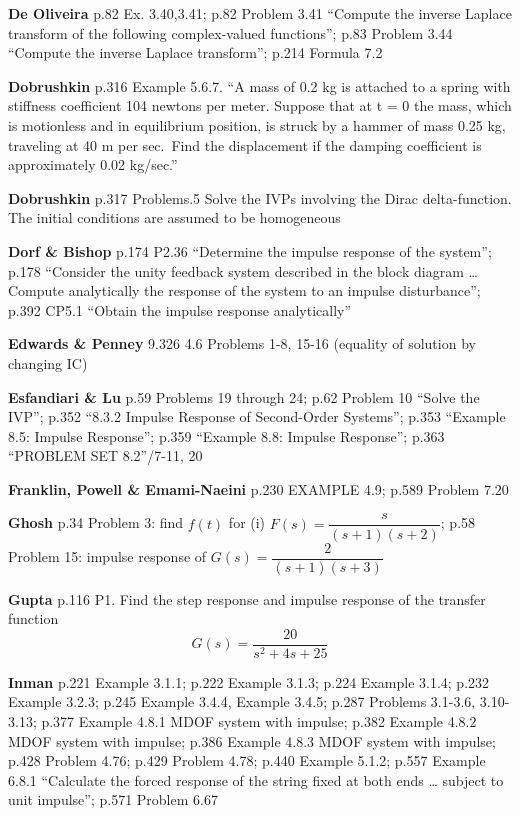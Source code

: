 \documentclass[
  11pt,
]{article}
\begin{document}
\textbf{De Oliveira} p.82 Ex. 3.40,3.41; p.82 Problem 3.41 ``Compute the
inverse Laplace transform of the following complex-valued functions'';
p.83 Problem 3.44 ``Compute the inverse Laplace transform''; p.214
Formula 7.2

\textbf{Dobrushkin} p.316 Example 5.6.7. ``A mass of 0.2 kg is attached
to a spring with stiffness coefficient 104 newtons per meter. Suppose
that at t = 0 the mass, which is motionless and in equilibrium position,
is struck by a hammer of mass 0.25 kg, traveling at 40 m per sec.~Find
the displacement if the damping coefficient is approximately 0.02
kg/sec.''

\textbf{Dobrushkin} p.317 Problems.5 Solve the IVPs involving the Dirac
delta-function. The initial conditions are assumed to be homogeneous

\textbf{Dorf \& Bishop} p.174 P2.36 ``Determine the impulse response of
the system''; p.178 ``Consider the unity feedback system described in
the block diagram \ldots{} Compute analytically the response of the
system to an impulse disturbance''; p.392 CP5.1 ``Obtain the impulse
response analytically''

\textbf{Edwards \& Penney} 9.326 4.6 Problems 1-8, 15-16 (equality of
solution by changing IC)

\textbf{Esfandiari \& Lu} p.59 Problems 19 through 24; p.62 Problem 10
``Solve the IVP''; p.352 ``8.3.2 Impulse Response of Second-Order
Systems''; p.353 ``Example 8.5: Impulse Response''; p.359 ``Example 8.8:
Impulse Response''; p.363 ``PROBLEM SET 8.2''/7-11, 20

\textbf{Franklin, Powell \& Emami-Naeini} p.230 EXAMPLE 4.9; p.589
Problem 7.20

\textbf{Ghosh} p.34 Problem 3: find \(f(t)\) for (i)
\(F(s)=\dfrac{s}{(s+1)(s+2)}\); p.58 Problem 15: impulse response of
\(G(s)=\dfrac{2}{(s+1)(s+3)}\)

\textbf{Gupta} p.116 P1. Find the step response and impulse response of
the transfer function \[G(s) = \frac{20}{s^2 + 4s + 25}\]

\textbf{Inman} p.221 Example 3.1.1; p.222 Example 3.1.3; p.224 Example
3.1.4; p.232 Example 3.2.3; p.245 Example 3.4.4, Example 3.4.5; p.287
Problems 3.1-3.6, 3.10-3.13; p.377 Example 4.8.1 MDOF system with
impulse; p.382 Example 4.8.2 MDOF system with impulse; p.386 Example
4.8.3 MDOF system with impulse; p.428 Problem 4.76; p.429 Problem 4.78;
p.440 Example 5.1.2; p.557 Example 6.8.1 ``Calculate the forced response
of the string fixed at both ends \ldots{} subject to unit impulse'';
p.571 Problem 6.67
\end{document}
